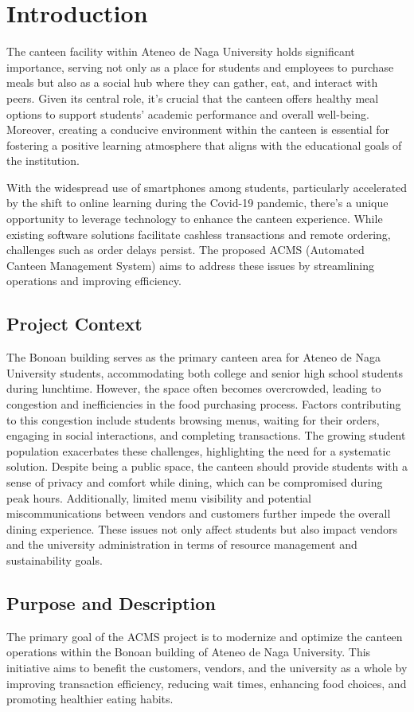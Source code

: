 \section{Introduction}
The canteen facility within Ateneo de Naga University holds significant importance, serving not only as a place for students and employees to purchase meals but also as a social hub where they can gather, eat, and interact with peers. Given its central role, it's crucial that the canteen offers healthy meal options to support students' academic performance and overall well-being. Moreover, creating a conducive environment within the canteen is essential for fostering a positive learning atmosphere that aligns with the educational goals of the institution.

With the widespread use of smartphones among students, particularly accelerated by the shift to online learning during the Covid-19 pandemic, there's a unique opportunity to leverage technology to enhance the canteen experience. While existing software solutions facilitate cashless transactions and remote ordering, challenges such as order delays persist. The proposed ACMS (Automated Canteen Management System) aims to address these issues by streamlining operations and improving efficiency.

\subsection{Project Context}
The Bonoan building serves as the primary canteen area for Ateneo de Naga University students, accommodating both college and senior high school students during lunchtime. However, the space often becomes overcrowded, leading to congestion and inefficiencies in the food purchasing process. Factors contributing to this congestion include students browsing menus, waiting for their orders, engaging in social interactions, and completing transactions. The growing student population exacerbates these challenges, highlighting the need for a systematic solution. Despite being a public space, the canteen should provide students with a sense of privacy and comfort while dining, which can be compromised during peak hours. Additionally, limited menu visibility and potential miscommunications between vendors and customers further impede the overall dining experience. These issues not only affect students but also impact vendors and the university administration in terms of resource management and sustainability goals.

\subsection{Purpose and Description}
The primary goal of the ACMS project is to modernize and optimize the canteen operations within the Bonoan building of Ateneo de Naga University. This initiative aims to benefit the customers, vendors, and the university as a whole by improving transaction efficiency, reducing wait times, enhancing food choices, and promoting healthier eating habits.

